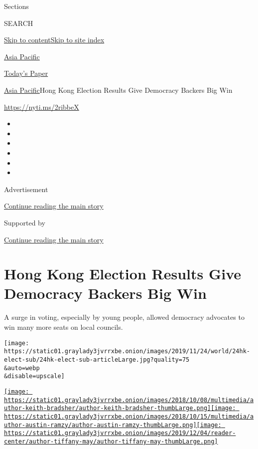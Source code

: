 Sections

SEARCH

\protect\hyperlink{site-content}{Skip to
content}\protect\hyperlink{site-index}{Skip to site index}

\href{https://www.nytimes3xbfgragh.onion/section/world/asia}{Asia
Pacific}

\href{https://myaccount.nytimes3xbfgragh.onion/auth/login?response_type=cookie\&client_id=vi}{}

\href{https://www.nytimes3xbfgragh.onion/section/todayspaper}{Today's
Paper}

\href{/section/world/asia}{Asia Pacific}\textbar{}Hong Kong Election
Results Give Democracy Backers Big Win

\url{https://nyti.ms/2ribbeX}

\begin{itemize}
\item
\item
\item
\item
\item
\item
\end{itemize}

Advertisement

\protect\hyperlink{after-top}{Continue reading the main story}

Supported by

\protect\hyperlink{after-sponsor}{Continue reading the main story}

\hypertarget{hong-kong-election-results-give-democracy-backers-big-win}{%
\section{Hong Kong Election Results Give Democracy Backers Big
Win}\label{hong-kong-election-results-give-democracy-backers-big-win}}

A surge in voting, especially by young people, allowed democracy
advocates to win many more seats on local councils.

\texttt{[image: https://static01.graylady3jvrrxbe.onion/images/2019/11/24/world/24hk-elect-sub/24hk-elect-sub-articleLarge.jpg?quality=75\\\&auto=webp\\\&disable=upscale]}

\href{https://www.nytimes3xbfgragh.onion/by/keith-bradsher}{\texttt{[image: https://static01.graylady3jvrrxbe.onion/images/2018/10/08/multimedia/author-keith-bradsher/author-keith-bradsher-thumbLarge.png]}}\href{https://www.nytimes3xbfgragh.onion/by/austin-ramzy}{\texttt{[image: https://static01.graylady3jvrrxbe.onion/images/2018/10/15/multimedia/author-austin-ramzy/author-austin-ramzy-thumbLarge.png]}}\href{https://www.nytimes3xbfgragh.onion/by/tiffany-may}{\texttt{[image: https://static01.graylady3jvrrxbe.onion/images/2019/12/04/reader-center/author-tiffany-may/author-tiffany-may-thumbLarge.png]}}

